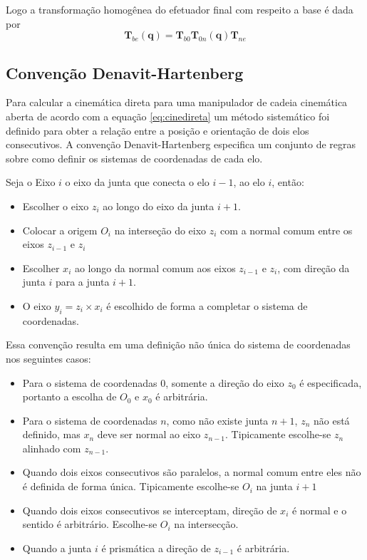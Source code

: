 Logo a transformação homogênea do efetuador final com respeito a base é dada por
\begin{equation}
\bm{T}_{be}(\bm{q}) = \bm{T}_{b0} \bm{T}_{0n}(\bm{q}) \bm{T}_{ne} 
\end{equation}

\subsection{Convenção Denavit-Hartenberg} \label{sec:denavit}
Para calcular a cinemática direta para uma manipulador de cadeia cinemática aberta de acordo com a equação \eqref{eq:cinedireta} um método sistemático foi definido para obter a relação entre a posição e orientação de dois elos consecutivos. A convenção Denavit-Hartenberg especifica um conjunto de regras sobre como definir os sistemas de coordenadas de cada elo.

Seja o Eixo $i$ o eixo da junta que conecta o elo $i-1$, ao elo $i$, então:

\begin{itemize}
\item Escolher o eixo $z_i$ ao longo do eixo da junta $i+1$.
\item Colocar a origem $O_i$ na interseção do eixo $z_i$ com a normal comum entre os eixos $z_{i-1}$ e $z_i$
\item Escolher $x_i$ ao longo da normal comum aos eixos $z_{i-1}$ e $z_i$, com direção da junta $i$ para a junta $i+1$. 
\item O eixo $y_i = z_i \times x_i$ é escolhido de forma a completar o sistema de coordenadas.
\end{itemize}

Essa convenção resulta em uma definição não única do sistema de coordenadas nos seguintes casos:

\begin{itemize}
\item Para o sistema de coordenadas $0$, somente a direção do eixo $z_0$ é especificada, portanto a escolha de $O_0$ e $ x_0$ é arbitrária.
\item Para o sistema de coordenadas $n$, como não existe junta $n+1$, $z_n$ não está definido, mas $x_n$ deve ser normal ao eixo $z_{n-1}$. Tipicamente escolhe-se $z_n$ alinhado com $z_{n-1}$.
\item Quando dois eixos consecutivos são paralelos, a normal comum entre eles não é definida de forma única. Tipicamente escolhe-se $O_i$ na junta $i+1$
\item  Quando dois eixos consecutivos se interceptam, direção de $x_i$ é normal e o sentido é arbitrário. Escolhe-se $O_i$ na intersecção.
\item Quando a junta $i$ é prismática a direção de $z_{i-1}$ é arbitrária.
\end{itemize}

